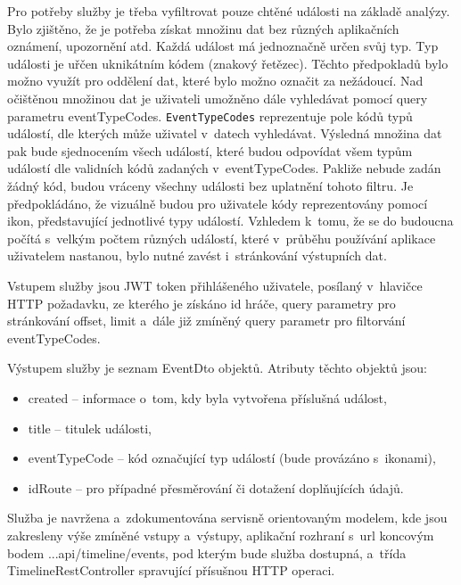\documentclass[twoside, 12pt]{article}
\begin{document}
{Pro potřeby služby je třeba vyfiltrovat pouze chtěné události na základě analýzy.
Bylo zjištěno, že je potřeba získat množinu dat bez různých aplikačních oznámení, upozornění atd.
Každá událost má jednoznačně určen svůj typ.
Typ události je uřčen uknikátním kódem (znakový řetězec).
Těchto předpokladů bylo možno využít pro oddělení dat, které bylo možno označit za nežádoucí.
Nad očištěnou množinou dat je uživateli umožněno dále vyhledávat pomocí query parametru eventTypeCodes.
\texttt{EventTypeCodes} reprezentuje pole kódů typů událostí, dle kterých může uživatel v~datech vyhledávat.
Výsledná množina dat pak bude sjednocením všech událostí,
které budou odpovídat všem typům událostí dle validních kódů zadaných v~eventTypeCodes.
Pakliže nebude zadán žádný kód, budou vráceny všechny události bez uplatnění tohoto filtru.
Je předpokládáno, že vizuálně budou pro uživatele kódy reprezentovány pomocí ikon,
představující jednotlivé typy událostí.
Vzhledem k~tomu, že se do budoucna počítá s~velkým počtem různých událostí,
které v~průběhu používání aplikace uživatelem nastanou,
bylo nutné zavést i~stránkování výstupních dat.

Vstupem služby jsou JWT token přihlášeného uživatele, posílaný v~hlavičce HTTP požadavku,
ze kterého je získáno id hráče, query parametry pro stránkování offset, limit
a~dále již zmíněný query parametr pro filtorvání eventTypeCodes.

Výstupem služby je seznam EventDto objektů.
Atributy těchto objektů jsou:
\begin{itemize}
\item created -- informace o~tom, kdy byla vytvořena příslušná událost,
\item title -- titulek události,
\item eventTypeCode -- kód označující typ událostí (bude provázáno s~ikonami),
\item idRoute -- pro případné přesměrování či dotažení doplňujících údajů.
\end{itemize}


Služba je navržena a~zdokumentována servisně orientovaným modelem, kde jsou zakresleny výše zmíněné vstupy a~výstupy,
aplikační rozhraní s~url koncovým bodem  ...api/timeline/events, pod kterým bude služba dostupná,
a~třída TimelineRestController spravující přísušnou HTTP operaci.

\clearpage

\obrazek
{}

}
\end{document}
